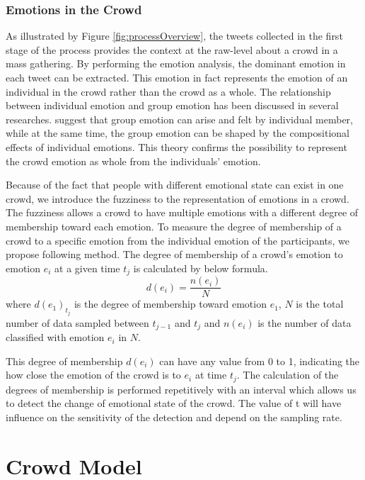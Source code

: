 \subsubsection{Emotions in the Crowd}
As illustrated by Figure \ref{fig:processOverview}, the tweets collected in the first stage of the process provides the context at the raw-level about a crowd in a mass gathering. By performing the emotion analysis, the dominant emotion in each tweet can be extracted. This emotion in fact represents the emotion of an individual in the crowd rather than the crowd as a whole. The relationship between individual emotion and group emotion has been discussed in several researches. \citet{barsade1998group} suggest that group emotion can arise and felt by individual member, while at the same time, the group emotion can be shaped by the compositional effects of individual emotions. This theory confirms the possibility to represent the crowd emotion as whole from the individuals' emotion.

Because of the fact that people with different emotional state can exist in one crowd, we introduce the fuzziness to the representation of emotions in a crowd. The fuzziness allows a crowd to have multiple emotions with a different degree of membership toward each emotion. To measure the degree of membership of a crowd to a specific emotion from the individual emotion of the participants, we propose following method. The degree of membership of a crowd's emotion to emotion \(e_i\) at a given time \(t_j\) is calculated by below formula.
\[
	d(e_i) = \frac{n(e_i)}{N}
\]
where \(d(e_1)_{t_j}\) is the degree of membership toward emotion \(e_1\), \(N\) is the total number of data sampled between \(t_{j-1}\) and \(t_j\) and \(n(e_i)\) is the number of data classified with emotion \(e_i\) in \(N\).

This degree of membership \(d(e_i)\) can have any value from 0 to 1, indicating the how close the emotion of the crowd is to \(e_i\) at time \(t_j\). The calculation of the degrees of membership is performed repetitively with an interval which allows us to detect the change of emotional state of the crowd. The value of t will have influence on the sensitivity of the detection and depend on the sampling rate.

\section{Crowd Model}

